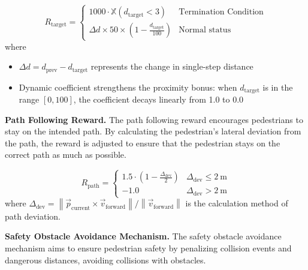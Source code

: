 \documentclass[lettersize,journal]{IEEEtran}
\begin{document}
\begin{equation}
	R_{\text{target}} =
	\begin{cases}
		1000 \cdot \mathbb{X}(d_{\text{target}}<3) & \text{Termination Condition} \\
		\Delta d \times 50 \times \left(1 - \frac{d_{\text{target}}}{100}\right) & \text{Normal status}
	\end{cases}
\end{equation}
where 
\begin{itemize}
	\item \( \Delta d = d_{\text{prev}} - d_{\text{target}} \) represents the change in single-step distance
	\item Dynamic coefficient strengthens the proximity bonus: when \( d_{\text{target}} \) is in the range \([0, 100]\), the coefficient decays linearly from 1.0 to 0.0
\end{itemize}



\textbf{Path Following Reward.}
%
The path following reward encourages pedestrians to stay on the intended path. 
By calculating the pedestrian's lateral deviation from the path, the reward is adjusted to ensure that the pedestrian stays on the correct path as much as possible.

\begin{equation}
	R_{\text{path}} =
	\begin{cases}
		1.5 \cdot \left(1 - \frac{\Delta_{\text{dev}}}{2}\right) & \Delta_{\text{dev}} \leq 2\ \text{m} \\
		-1.0 & \Delta_{\text{dev}} > 2\ \text{m}
	\end{cases}
\end{equation}
where \( \Delta_{\text{dev}} = \left\| \vec{p}_{\text{current}} \times \vec{v}_{\text{forward}} \right\| / \left\| \vec{v}_{\text{forward}} \right\| \) is the calculation method of path deviation.



\textbf{Safety Obstacle Avoidance Mechanism.}
The safety obstacle avoidance mechanism aims to ensure pedestrian safety by penalizing collision events and dangerous distances, avoiding collisions with obstacles.
\end{document}
